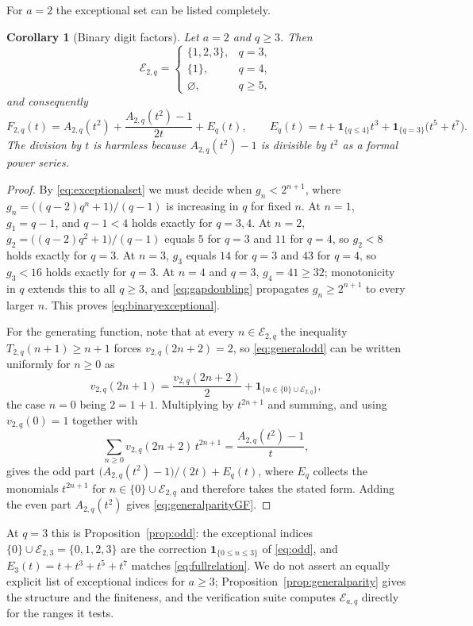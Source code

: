 \documentclass[11pt,letterpaper]{article}
\numberwithin{equation}{section}
\newtheorem{corollary}[theorem]{Corollary}
\theoremstyle{definition}
\theoremstyle{remark}
\newcommand{\ind}[1]{\boldsymbol{1}_{\{#1\}}}
\begin{document}
For $a=2$ the exceptional set can be listed completely.

\begin{corollary}[Binary digit factors]\label{cor:binaryparity}
Let $a=2$ and $q\ge3$. Then
\begin{equation}\label{eq:binaryexceptional}
 \mathcal E_{2,q}=
 \begin{cases}
  \{1,2,3\},&q=3,\\
  \{1\},&q=4,\\
  \varnothing,&q\ge5,
 \end{cases}
\end{equation}
and consequently
\begin{equation}\label{eq:generalparityGF}
 F_{2,q}(t)=A_{2,q}(t^2)+\frac{A_{2,q}(t^2)-1}{2t}+E_q(t),
 \qquad
 E_q(t)=t+\ind{q\le4}t^3+\ind{q=3}\bigl(t^5+t^7\bigr).
\end{equation}
The division by $t$ is harmless because $A_{2,q}(t^2)-1$ is divisible by
$t^2$ as a formal power series.
\end{corollary}
\begin{proof}
By \eqref{eq:exceptionalset} we must decide when $g_n<2^{n+1}$, where
$g_n=\bigl((q-2)q^n+1\bigr)/(q-1)$ is increasing in $q$ for fixed $n$.
At $n=1$, $g_1=q-1$, and $q-1<4$ holds exactly for $q=3,4$.
At $n=2$, $g_2=\bigl((q-2)q^2+1\bigr)/(q-1)$ equals $5$ for $q=3$ and
$11$ for $q=4$, so $g_2<8$ holds exactly for $q=3$.
At $n=3$, $g_3$ equals $14$ for $q=3$ and $43$ for $q=4$, so $g_3<16$ holds
exactly for $q=3$. At $n=4$ and $q=3$, $g_4=41\ge32$; monotonicity in $q$
extends this to all $q\ge3$, and \eqref{eq:gapdoubling} propagates
$g_n\ge2^{n+1}$ to every larger $n$. This proves
\eqref{eq:binaryexceptional}.

For the generating function, note that at every $n\in\mathcal E_{2,q}$ the
inequality $T_{2,q}(n+1)\ge n+1$ forces $v_{2,q}(2n+2)=2$, so
\eqref{eq:generalodd} can be written uniformly for $n\ge0$ as
\[
 v_{2,q}(2n+1)=\frac{v_{2,q}(2n+2)}{2}
 +\ind{n\in\{0\}\cup\mathcal E_{2,q}},
\]
the case $n=0$ being $2=1+1$. Multiplying by $t^{2n+1}$ and summing, and
using $v_{2,q}(0)=1$ together with
\[
 \sum_{n\ge0}v_{2,q}(2n+2)\,t^{2n+1}=\frac{A_{2,q}(t^2)-1}{t},
\]
gives the odd part $\bigl(A_{2,q}(t^2)-1\bigr)/(2t)+E_q(t)$, where $E_q$
collects the monomials $t^{2n+1}$ for $n\in\{0\}\cup\mathcal E_{2,q}$ and
therefore takes the stated form. Adding the even part $A_{2,q}(t^2)$ gives
\eqref{eq:generalparityGF}.
\end{proof}

At $q=3$ this is Proposition~\ref{prop:odd}: the exceptional indices
$\{0\}\cup\mathcal E_{2,3}=\{0,1,2,3\}$ are the correction $\ind{0\le n\le3}$
of \eqref{eq:odd}, and $E_3(t)=t+t^3+t^5+t^7$ matches
\eqref{eq:fullrelation}. We do not assert an equally explicit list of
exceptional indices for $a\ge3$; Proposition~\ref{prop:generalparity}
gives the structure and the finiteness, and the verification suite computes
$\mathcal E_{a,q}$ directly for the ranges it tests.
\end{document}
